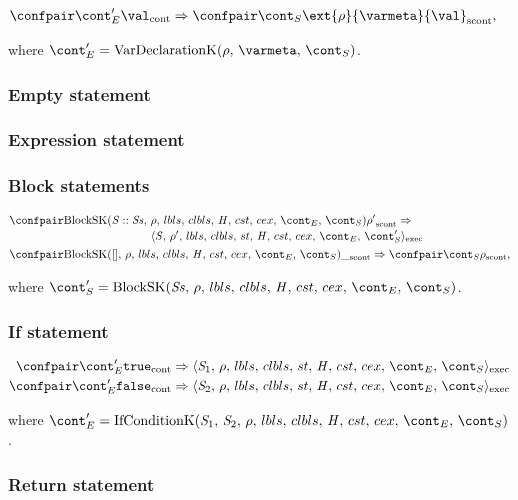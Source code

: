 \documentclass{article}
\newcommand{\cesktrans}[2]{\ensuremath{{#1} \Rightarrow {#2}}}
\newcommand{\cesktransalign}[2]{\ensuremath{{#1} &\Rightarrow {#2}}}
\newcommand{\cesktranssplit}[2]{\ensuremath{{#1} \Rightarrow\\ {#2}}}
\begin{document}
\begin{align*}
&\cesktrans%
    {\contconf{\econt'}{\val}}%
    {\scontconf{\scont}{\ext{\env}{\varmeta}{\val}}},
\end{align*}

\noindent where $\econt' = \VarDeclK{\env}{\varmeta}{\scont}$.


\subsubsection{Empty statement}
\label{subsubsec:emtpy-stmt}


\subsubsection{Expression statement}
\label{expression-stmt}

\subsubsection{Block statements}
  \begin{align*}
    &\begin{multlined}
        \cesktranssplit%
          {\scontconf{\BlockSK{\stmt :: \stmts}{\env}}{\env'}}
          {\execconf{\stmt}{\env'}{\lbls}{\clbls}{\handler}{\cstrace}{\cex}{\econt}{\scont'}}
    \end{multlined}\\
    &\cesktrans%
      {\scontconf{\BlockSK{[]}{\env}}{ \_ }}%
      {\scontconf{\scont}{\env}},
  \end{align*}

\noindent where $\scont' = \BlockSK{\stmts}{\env}$.

\subsubsection{If statement}

\begin{align*}
    \cesktransalign%
        {\contconf{\econt'}{\true}}%
        {\execconf{\stmti{1}}{\env}{\lbls}{\clbls}{\handler}{\cstrace}{\cex}{\econt}{\scont}}\\
    \cesktransalign%
        {\contconf{\econt'}{\false}}%
        {\execconf{\stmti{2}}{\env}{\lbls}{\clbls}{\handler}{\cstrace}{\cex}{\econt}{\scont}}
\end{align*}

\noindent where $\econt' = \IfCondK{\stmti{1}}{\stmti{2}}$.


\subsubsection{Return statement}
\end{document}
